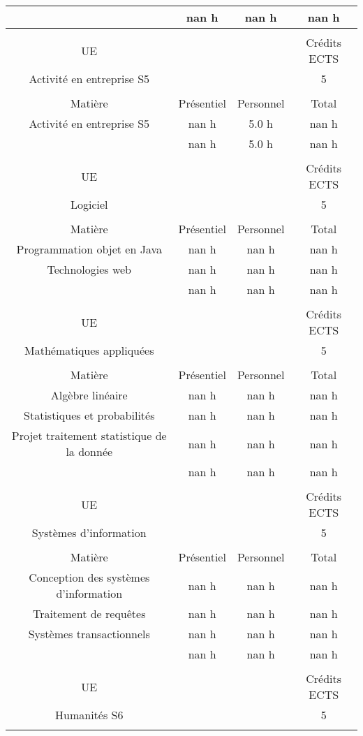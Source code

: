 \begin{longtable}{c c c c}
\hline%
&nan h&nan h&nan h\\%
\hline%
&&&\\%
UE&&&Crédits ECTS\\%
Activité en entreprise S5&&&5\\%
&&&\\%
Matière&Présentiel&Personnel&Total\\%
Activité en entreprise S5&nan h&5.0 h&nan h\\%
\hline%
&nan h&5.0 h&nan h\\%
\hline%
&&&\\%
UE&&&Crédits ECTS\\%
Logiciel&&&5\\%
&&&\\%
Matière&Présentiel&Personnel&Total\\%
Programmation objet en Java&nan h&nan h&nan h\\%
Technologies web&nan h&nan h&nan h\\%
\hline%
&nan h&nan h&nan h\\%
\hline%
&&&\\%
UE&&&Crédits ECTS\\%
Mathématiques appliquées&&&5\\%
&&&\\%
Matière&Présentiel&Personnel&Total\\%
Algèbre linéaire&nan h&nan h&nan h\\%
Statistiques et probabilités&nan h&nan h&nan h\\%
Projet traitement statistique de la donnée&nan h&nan h&nan h\\%
\hline%
&nan h&nan h&nan h\\%
\hline%
&&&\\%
UE&&&Crédits ECTS\\%
Systèmes d'information&&&5\\%
&&&\\%
Matière&Présentiel&Personnel&Total\\%
Conception des systèmes d'information&nan h&nan h&nan h\\%
Traitement de requêtes&nan h&nan h&nan h\\%
Systèmes transactionnels&nan h&nan h&nan h\\%
\hline%
&nan h&nan h&nan h\\%
\hline%
&&&\\%
UE&&&Crédits ECTS\\%
Humanités S6 &&&5\\%
&&&\\%

\end{longtable}
